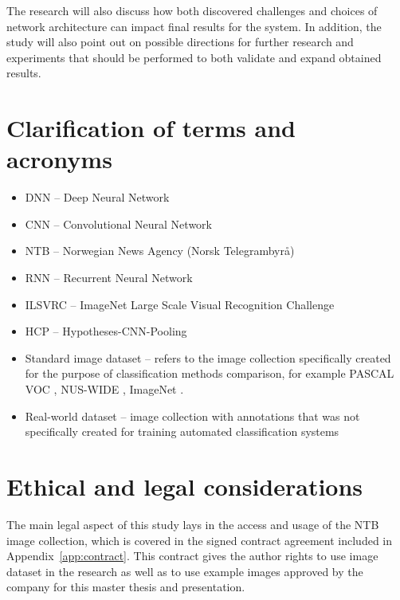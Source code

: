     The research will also discuss how both discovered challenges and choices of network architecture can impact final results for the system. In addition, the study will also point out on possible directions for further research and experiments that should be performed to both validate and expand obtained results.
    

\section{Clarification of terms and acronyms}
    \begin{itemize}
        \item DNN -- Deep Neural Network
        \item CNN -- Convolutional Neural Network
        \item NTB -- Norwegian News Agency (Norsk Telegrambyrå)
        \item RNN -- Recurrent Neural Network
        \item ILSVRC -- ImageNet Large Scale Visual Recognition Challenge
        \item HCP -- Hypotheses-CNN-Pooling
        \item Standard image dataset -- refers to the image collection specifically created for the purpose of classification methods comparison, for example PASCAL VOC \cite{Everingham2010PASCAL-VOC}, NUS-WIDE \cite{Chua2009NUS-WIDE}, ImageNet \cite{Russakovsky2015ImageNet}.
        \item Real-world dataset -- image collection with annotations that was not specifically created for training automated classification systems
    \end{itemize}

\section{Ethical and legal considerations}
    The main legal aspect of this study lays in the access and usage of the NTB image collection, which is covered in the signed contract agreement included in Appendix~\ref{app:contract}. This contract gives the author rights to use image dataset in the research as well as to use example images approved by the company for this master thesis and presentation.